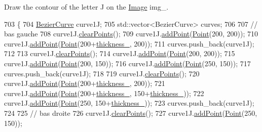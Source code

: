 Draw the contour of the letter J on the \mbox{\hyperlink{class_image}{Image}} img\+\_\+. 


\begin{DoxyCode}
703               \{
704     \mbox{\hyperlink{class_bezier_curve}{BezierCurve}} curve1J;
705     std::vector<BezierCurve> curves;
706 
707     \textcolor{comment}{// bas gauche}
708     curve1J.\mbox{\hyperlink{class_bezier_curve_a0ba8ce66d5af5971ae6a1b506029728e}{clearPoints}}();
709     curve1J.\mbox{\hyperlink{class_bezier_curve_a38d16c18b36ae45619b05e26e226cf34}{addPoint}}(\mbox{\hyperlink{class_point}{Point}}(200, 200));
710     curve1J.\mbox{\hyperlink{class_bezier_curve_a38d16c18b36ae45619b05e26e226cf34}{addPoint}}(\mbox{\hyperlink{class_point}{Point}}(200+\mbox{\hyperlink{class_font_v1_aed8040e76be9a52833627b92f0fb4e5f}{thickness\_}}, 200));
711     curves.push\_back(curve1J);
712 
713     curve1J.\mbox{\hyperlink{class_bezier_curve_a0ba8ce66d5af5971ae6a1b506029728e}{clearPoints}}();
714     curve1J.\mbox{\hyperlink{class_bezier_curve_a38d16c18b36ae45619b05e26e226cf34}{addPoint}}(\mbox{\hyperlink{class_point}{Point}}(200, 200));
715     curve1J.\mbox{\hyperlink{class_bezier_curve_a38d16c18b36ae45619b05e26e226cf34}{addPoint}}(\mbox{\hyperlink{class_point}{Point}}(200, 150));
716     curve1J.\mbox{\hyperlink{class_bezier_curve_a38d16c18b36ae45619b05e26e226cf34}{addPoint}}(\mbox{\hyperlink{class_point}{Point}}(250, 150));
717     curves.push\_back(curve1J);
718 
719     curve1J.\mbox{\hyperlink{class_bezier_curve_a0ba8ce66d5af5971ae6a1b506029728e}{clearPoints}}();
720     curve1J.\mbox{\hyperlink{class_bezier_curve_a38d16c18b36ae45619b05e26e226cf34}{addPoint}}(\mbox{\hyperlink{class_point}{Point}}(200+\mbox{\hyperlink{class_font_v1_aed8040e76be9a52833627b92f0fb4e5f}{thickness\_}}, 200));
721     curve1J.\mbox{\hyperlink{class_bezier_curve_a38d16c18b36ae45619b05e26e226cf34}{addPoint}}(\mbox{\hyperlink{class_point}{Point}}(200+\mbox{\hyperlink{class_font_v1_aed8040e76be9a52833627b92f0fb4e5f}{thickness\_}}, 150+\mbox{\hyperlink{class_font_v1_aed8040e76be9a52833627b92f0fb4e5f}{thickness\_}}));
722     curve1J.\mbox{\hyperlink{class_bezier_curve_a38d16c18b36ae45619b05e26e226cf34}{addPoint}}(\mbox{\hyperlink{class_point}{Point}}(250, 150+\mbox{\hyperlink{class_font_v1_aed8040e76be9a52833627b92f0fb4e5f}{thickness\_}}));
723     curves.push\_back(curve1J);
724 
725     \textcolor{comment}{// bas droite}
726     curve1J.\mbox{\hyperlink{class_bezier_curve_a0ba8ce66d5af5971ae6a1b506029728e}{clearPoints}}();
727     curve1J.\mbox{\hyperlink{class_bezier_curve_a38d16c18b36ae45619b05e26e226cf34}{addPoint}}(\mbox{\hyperlink{class_point}{Point}}(250, 150));

\end{DoxyCode}
